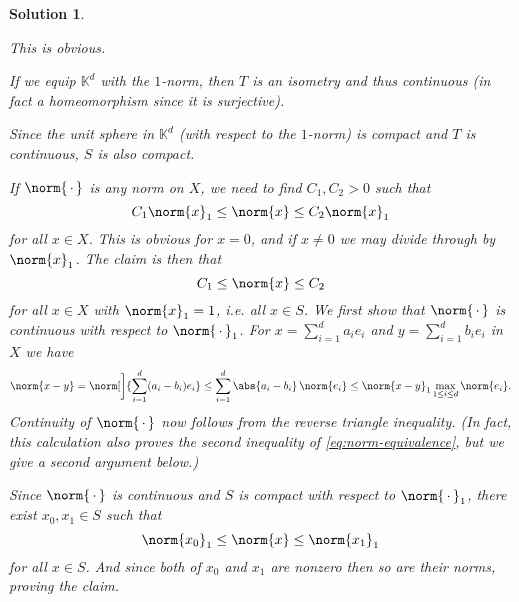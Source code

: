 \documentclass[article, a4paper, 11pt, oneside]{memoir}
\numberwithin{equation}{chapter}
\newcommand{\bbK}{\mathbb{K}}
\theoremstyle{nonumberplain}
\newtheorem{solution}{Solution}
\begin{document}
\begin{solution}
\begin{solutionsec}
	\item This is obvious.
	
	\item If we equip $\bbK^d$ with the $1$-norm, then $T$ is an isometry and thus continuous (in fact a homeomorphism since it is surjective).

	\item Since the unit sphere in $\bbK^d$ (with respect to the $1$-norm) is compact and $T$ is continuous, $S$ is also compact.

	\item If $\norm{\,\cdot\,}$ is any norm on $X$, we need to find $C_1,C_2 > 0$ such that
	\begin{equation}
		\label{eq:norm-equivalence}
		C_1 \norm{x}_1
			\leq \norm{x}
			\leq C_2 \norm{x}_1
	\end{equation}
	for all $x \in X$. This is obvious for $x = 0$, and if $x \neq 0$ we may divide through by $\norm{x}_1$. The claim is then that
	\begin{equation*}
		C_1
			\leq \norm{x}
			\leq C_2
	\end{equation*}
	for all $x \in X$ with $\norm{x}_1 = 1$, i.e. all $x \in S$. We first show that $\norm{\,\cdot\,}$ is continuous with respect to $\norm{\,\cdot\,}_1$. For $x = \sum_{i=1}^d a_i e_i$ and $y = \sum_{i=1}^d b_i e_i$ in $X$ we have
	\begin{equation*}
		\norm{x-y}
			= \norm[\bigg]{ \sum_{i=1}^d (a_i - b_i) e_i }
			\leq \sum_{i=1}^d \abs{a_i - b_i} \, \norm{e_i}
			\leq \norm{x-y}_1 \max_{1 \leq i \leq d} \norm{e_i}.
	\end{equation*}
	Continuity of $\norm{\,\cdot\,}$ now follows from the reverse triangle inequality. (In fact, this calculation also proves the second inequality of \cref{eq:norm-equivalence}, but we give a second argument below.)

	Since $\norm{\,\cdot\,}$ is continuous and $S$ is compact with respect to $\norm{\,\cdot\,}_1$, there exist $x_0, x_1 \in S$ such that
	\begin{equation*}
		\norm{x_0}_1
			\leq \norm{x}
			\leq \norm{x_1}_1
	\end{equation*}
	for all $x \in S$. And since both of $x_0$ and $x_1$ are nonzero then so are their norms, proving the claim.
\end{solutionsec}
\end{solution}
\end{document}

